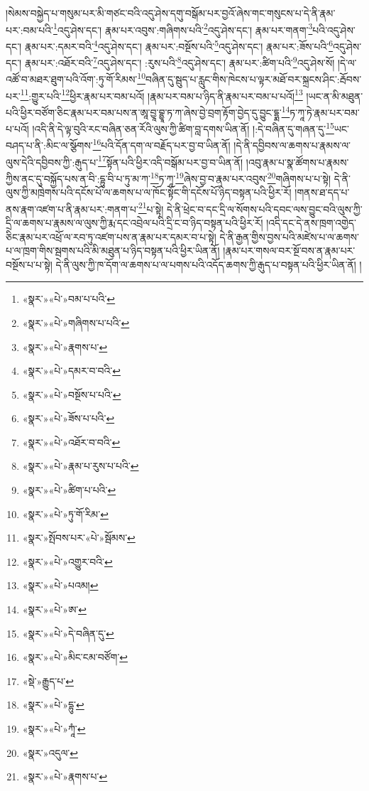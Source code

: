 །སེམས་བསྐྱེད་པ་གསུམ་པར་མི་གཙང་བའི་འདུ་ཤེས་དགུ་བསྒོམ་པར་བྱའོ་ཞེས་གང་གསུངས་པ་དེ་ནི་རྣམ་པར་:བམ་པའི་\footnote{«སྣར་»«པེ་»བམ་པ་པའི་}འདུ་ཤེས་དང་། རྣམ་པར་འབུས་:གཞིགས་པའི་\footnote{«སྣར་»«པེ་»གཞིགས་པ་པའི་}འདུ་ཤེས་དང་། རྣམ་པར་གནག་\footnote{«སྣར་»«པེ་»རྣགས་པ་}པའི་འདུ་ཤེས་དང་། རྣམ་པར་:དམར་བའི་\footnote{«སྣར་»«པེ་»དམར་བ་བའི་}འདུ་ཤེས་དང་། རྣམ་པར་:བསྔོས་པའི་\footnote{«སྣར་»«པེ་»བསྔོས་པ་པའི་}འདུ་ཤེས་དང་། རྣམ་པར་:ཟོས་པའི་\footnote{«སྣར་»«པེ་»ཟོས་པ་པའི་}འདུ་ཤེས་དང་། རྣམ་པར་:འཐོར་བའི་\footnote{«སྣར་»«པེ་»འཐོར་བ་བའི་}འདུ་ཤེས་དང་། :རུས་པའི་\footnote{«སྣར་»«པེ་»རྣམ་པ་རུས་པ་པའི་}འདུ་ཤེས་དང་། རྣམ་པར་:ཚིག་པའི་\footnote{«སྣར་»«པེ་»ཚིག་པ་པའི་}འདུ་ཤེས་སོ། །དེ་ལ་འཚོ་བ་མཐར་ཐུག་པའི་འོག་:ཏུ་གོ་རིམས་\footnote{«སྣར་»«པེ་»ཏུ་གོ་རིམ་}བཞིན་དུ་སྦུད་པ་རླུང་གིས་ཁེངས་པ་ལྟར་མཐོ་བར་སྐྲངས་ཤིང་:རྦོབས་པར་\footnote{«སྣར་»སྤོབས་པར་«པེ་»སྦོམས་}:གྱུར་པའི་\footnote{«སྣར་»«པེ་»འགྱུར་བའི་}ཕྱིར་རྣམ་པར་བམ་པའོ། །རྣམ་པར་བམ་པ་ཉིད་ནི་རྣམ་པར་བམ་པ་པའོ།\footnote{«སྣར་»«པེ་»པའམ།} །ཡང་ན་མི་མཐུན་པའི་ཕྱིར་བཙོག་ཅིང་རྣམ་པར་བམ་པས་ན་ཨཱ་བྱཱ་བྷྱཱ་ཏ་ཀ་ཞེས་བྱེ་བྲག་རྟོག་བྱེད་དུ་བྱུང་དྷྨ་\footnote{«སྣར་»«པེ་»ཨ་}ཏ་ཀཱ་ཏེ་རྣམ་པར་བམ་པ་པའོ། །འདི་ནི་དེ་ལྟ་བུའི་རང་བཞིན་ཅན་རོའི་ལུས་ཀྱི་ཚིག་བླ་དགས་ཡིན་ནོ། །:དེ་བཞིན་དུ་གཞན་དུ་\footnote{«སྣར་»«པེ་»དེ་བཞིན་དུ་}ཡང་བཤད་པ་ནི་:མིང་ལ་སྩོགས་\footnote{«སྣར་»«པེ་»མིང་ངམ་བཙོག་}པའི་དོན་དག་ལ་བརྗོད་པར་བྱ་བ་ཡིན་ནོ། །དེ་ནི་དབྱིབས་ལ་ཆགས་པ་རྣམས་ལ་ལུས་དེའི་དབྱིབས་ཀྱི་:རྒུད་པ་\footnote{«སྡེ་»རྒྱུད་པ་}སྟོན་པའི་ཕྱིར་འདི་བསྒོམ་པར་བྱ་བ་ཡིན་ནོ། །འབུ་རྣམ་པ་སྣ་ཚོགས་པ་རྣམས་ཀྱིས་ནང་དུ་བསྐྱོད་པས་ན་བི་:དྷུ་བི་པ་ཏུ་མ་ཀ་\footnote{«སྣར་»«པེ་»དྷུ་}ཏ་ཀཱ་\footnote{«སྣར་»«པེ་»ཀཱཾ་}ཞེས་བྱ་བ་རྣམ་པར་འབུས་\footnote{«སྣར་»འདུལ་}གཞིགས་པ་པ་སྟེ། དེ་ནི་ལུས་ཀྱི་མཁྲེགས་པའི་དངོས་པོ་ལ་ཆགས་པ་ལ་ཁོང་སྟོང་གི་དངོས་པོ་ཉིད་བསྟན་པའི་ཕྱིར་རོ། །གནས་ཐ་དད་པ་ནས་རྣག་འཛག་པ་ནི་རྣམ་པར་:གནག་པ་\footnote{«སྣར་»«པེ་»རྣགས་པ་}པ་སྟེ། དེ་ནི་ཕྲེང་བ་དང་དྲི་ལ་སོགས་པའི་དབང་ལས་བྱུང་བའི་ལུས་ཀྱི་དྲི་ལ་ཆགས་པ་རྣམས་ལ་ལུས་ཀྱི་རྨ་དང་འབྲེལ་པའི་དྲི་ང་བ་ཉིད་བསྟན་པའི་ཕྱིར་རོ། །འདི་དང་དེ་ནས་ཁྲག་འགྱེད་ཅིང་རྣམ་པར་འཕྲོ་ལ་རབ་ཏུ་འཛག་པས་ན་རྣམ་པར་དམར་བ་པ་སྟེ། དེ་ནི་རྒྱན་གྱིས་བྱས་པའི་མཛེས་པ་ལ་ཆགས་པ་ལ་ཁྲག་གིས་སྦགས་པའི་མི་མཐུན་པ་ཉིད་བསྟན་པའི་ཕྱིར་ཡིན་ནོ། །རྣམ་པར་གསལ་བར་སྔོ་བས་ན་རྣམ་པར་བསྔོས་པ་པ་སྟེ། དེ་ནི་ལུས་ཀྱི་ཁ་དོག་ལ་ཆགས་པ་ལ་པགས་པའི་འདོད་ཆགས་ཀྱི་རྒུད་པ་བསྟན་པའི་ཕྱིར་ཡིན་ནོ། །
